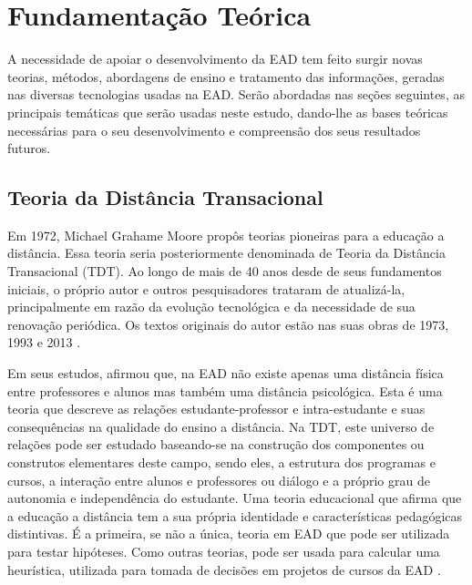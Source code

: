 \chapter{Fundamentação Teórica}

A necessidade de apoiar o desenvolvimento da EAD tem feito surgir novas teorias,
métodos, abordagens de ensino e tratamento das informações, geradas nas diversas
tecnologias usadas na EAD. Serão abordadas nas seções seguintes, as principais
temáticas que serão usadas neste estudo, dando-lhe as bases teóricas necessárias
para o seu desenvolvimento e compreensão dos seus resultados futuros.

\section{Teoria da Distância Transacional}

Em 1972, Michael Grahame Moore propôs teorias pioneiras para a educação a
distância. Essa teoria seria posteriormente denominada de Teoria da Distância
Transacional (TDT). Ao longo de mais de 40 anos desde de seus fundamentos
iniciais, o próprio autor e outros pesquisadores trataram de atualizá-la,
principalmente em razão da evolução tecnológica e da necessidade de sua
renovação periódica. Os textos originais do autor estão nas suas obras de 1973,
1993 e 2013 \cite{moore1973transational}.

Em seus estudos,  afirmou que, na EAD
não existe apenas uma distância física entre professores e alunos mas também uma
distância psicológica. Esta é uma teoria que descreve as relações
estudante-professor e intra-estudante e suas consequências na qualidade do
ensino a distância. Na TDT, este universo de relações pode ser estudado
baseando-se na construção dos componentes ou construtos elementares deste campo,
sendo eles, a estrutura dos programas e cursos, a interação entre alunos e
professores ou diálogo e a próprio grau de autonomia e independência do
estudante. Uma teoria educacional que afirma que a educação a distância tem a
sua própria identidade e características pedagógicas distintivas. É a primeira,
se não a única, teoria em EAD que pode ser utilizada para testar hipóteses. Como
outras teorias, pode ser usada para calcular uma heurística, utilizada para
tomada de decisões em projetos de cursos da EAD \cite{moore2008teoria}.

